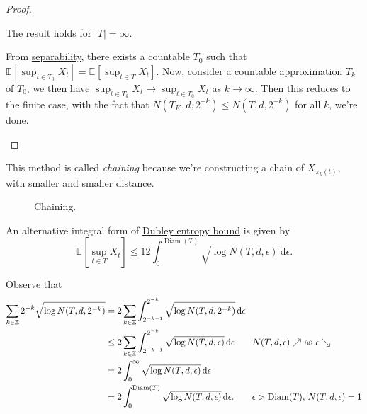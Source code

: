 \begin{proof}
	\begin{claim}
		The result holds for \(\vert T \vert = \infty \).
	\end{claim}
	\begin{explanation}
		From \hyperref[def:separable]{separability}, there exists a countable \(T_0\) such that \(\mathbb{E}_{}\left[\sup _{t\in T_0} X_t \right] = \mathbb{E}_{}\left[\sup _{t\in T} X_t \right] \). Now, consider a countable approximation \(T_k\) of \(T_0\), we then have \(\sup _{t\in T_k} X_t \to \sup _{t\in T_0} X_t\) as \(k \to \infty \). Then this reduces to the finite case, with the fact that \(N(T_K, d, 2^{-k}) \leq N(T, d, 2^{-k})\) for all \(k\), we're done.
	\end{explanation}
\end{proof}

This method is called \emph{chaining} because we're constructing a chain of \(X_{\pi _{k}(t)}\), with smaller and smaller distance.
\begin{figure}[H]
	\centering
	\caption{Chaining.}
	\label{fig:chaining}
\end{figure}

\begin{remark}\label{rmk:Dubley-integral-entropy-bound}
	An alternative integral form of \hyperref[thm:Dudley-entropy-bound]{Dubley entropy bound} is given by
	\[
		\mathbb{E}_{}\left[\sup _{t\in T} X_t \right] \leq 12 \int_{0}^{\mathop{\mathrm{Diam}}(T) }\sqrt{\log N(T, d, \epsilon )} \,\mathrm{d}\epsilon.
	\]
\end{remark}
\begin{explanation}
	Observe that
	\begin{align*}
		\sum_{k\in \mathbb{Z} } 2^{-k} \sqrt{\log N(T, d, 2^{-k})}
		 & = 2 \sum_{k\in \mathbb{Z} } \int_{2^{-k-1}}^{2^{-k}} \sqrt{\log N(T, d, 2^{-k})}  \,\mathrm{d} \epsilon                                                                        \\
		 & \leq 2 \sum_{k\in \mathbb{Z} } \int_{2^{-k-1}}^{2^{-k}} \sqrt{\log N(T, d, \epsilon )} \,\mathrm{d} \epsilon \tag*{\(N(T, d, \epsilon ) \nearrow \) as \(\epsilon \searrow \)} \\
		 & = 2 \int_{0}^{\infty} \sqrt{\log N(T, d, \epsilon )} \,\mathrm{d}\epsilon                                                                                                      \\
		 & = 2 \int_{0}^{\mathop{\mathrm{Diam}}(T) } \sqrt{\log N(T, d, \epsilon )} \,\mathrm{d}\epsilon. \tag*{\(\epsilon > \mathop{\mathrm{Diam}}(T) \), \(N(T, d, \epsilon ) = 1\)}
	\end{align*}
\end{explanation}